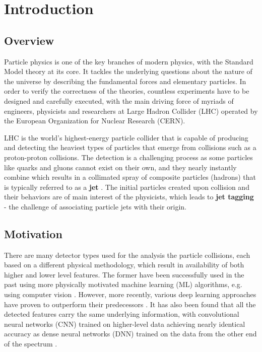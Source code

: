 \chapter{Introduction}

\section{Overview}
Particle physics is one of the key branches of modern physics, with the Standard Model theory at its core. It tackles the underlying questions about the nature of the universe by describing the fundamental forces and elementary particles. In order to verify the correctness of the theories, countless experiments have to be designed and carefully executed, with the main driving force of myriads of engineers, physicists and researchers at Large Hadron Collider (LHC) operated by the European Organization for Nuclear Research (CERN).

LHC is the world's highest-energy particle collider that is capable of producing and detecting the heaviest types of particles that emerge from collisions such as a proton-proton collisions. The detection is a challenging process as some particles like quarks and gluons cannot exist on their own, and they nearly instantly combine which results in a collimated spray of composite particles (hadrons) that is typically referred to as a \textbf{jet} \cite{4-cernjets}. The initial particles created upon collision and their behaviors are of main interest of the physicists, which leads to \textbf{jet tagging} - the challenge of associating particle jets with their origin.


\section{Motivation}
There are many detector types used for the analysis the particle collisions, each based on a different physical methodology, which result in availability of both higher and lower level features. The former have been successfully used in the past using more physically motivated machine learning (ML) algorithms, e.g. using computer vision \cite{5-cogan2015jet-images:}. However, more recently, various deep learning approaches have proven to outperform their predecessors \cite{6-de2016jet-images}. It has also been found that all the detected features carry the same underlying information, with convolutional neural networks (CNN) trained on higher-level data achieving nearly identical accuracy as dense neural networks (DNN) trained on the data from the other end of the spectrum \cite{7-moore2019reports}.

